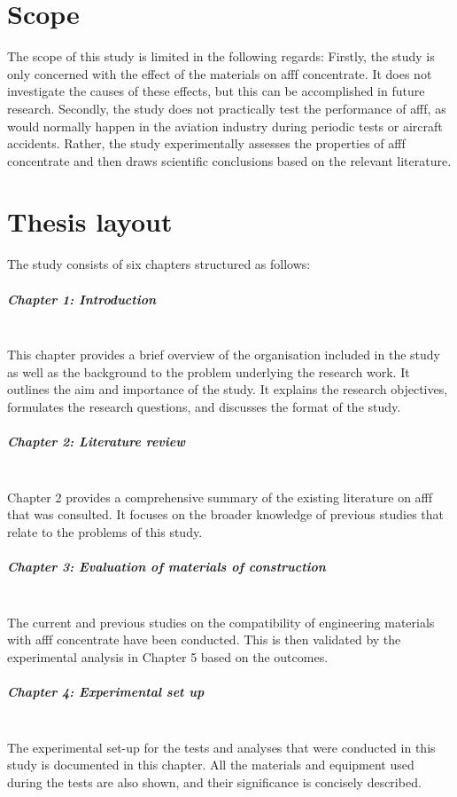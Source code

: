 \section{Scope}
The scope of this study is limited in the following regards: Firstly, the study is only concerned with the effect of the materials on \acrshort{afff} concentrate. It does not investigate the causes of these effects, but this can be accomplished in future research. Secondly, the study does not practically test the performance of \acrshort{afff}, as would normally happen in the aviation industry during periodic tests or aircraft accidents. Rather, the study experimentally assesses the properties of \acrshort{afff} concentrate and then draws scientific conclusions based on the relevant literature.

\section{Thesis layout}
The study consists of six chapters structured as follows:

\subparagraph*{Chapter 1: Introduction}\hfill\\
This chapter provides a brief overview of the organisation included in the study as well as the background to the problem underlying the research work. It outlines the aim and importance of the study. It explains the research objectives, formulates the research questions, and discusses the format of the study.

\subparagraph*{Chapter 2: Literature review}\hfill\\
Chapter 2 provides a comprehensive summary of the existing literature on \acrshort{afff} that was consulted. It focuses on the broader knowledge of previous studies that relate to the problems of this study.

\subparagraph*{Chapter 3: Evaluation of materials of construction}\hfill\\
The current and previous studies on the compatibility of engineering materials with \acrshort{afff} concentrate have been conducted. This is then validated by the experimental analysis in Chapter 5 based on the outcomes. 

\subparagraph*{Chapter 4: Experimental set up}\hfill\\
The experimental set-up for the tests and analyses that were conducted in this study is documented in this chapter. All the materials and equipment used during the tests are also shown, and their significance is concisely described.  

